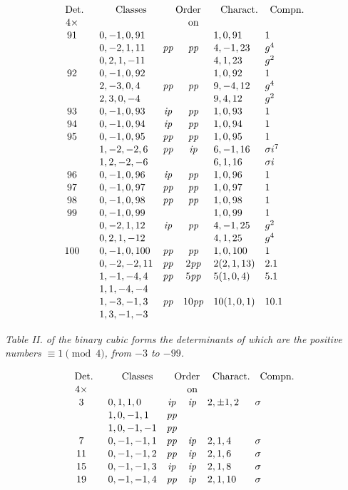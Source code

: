 ﻿\documentclass[11pt,a4paper]{article}
\theoremstyle{plain}
\theoremstyle{definition}
\newcommand{\pp}{\mathit{pp}}
\newcommand{\ip}{\mathit{ip}}
\newcommand{\sg}{\sigma}
\newcommand{\row}[7]{#1 & #2 & #3 & #4 & #5 & #6 & #7\\}
\begin{document}
\[
\renewcommand{\arraystretch}{1.06}
\begin{array}{c@{\quad}r@{\quad}l@{\quad}c@{\quad}c@{\quad}l@{\quad}l}
\multicolumn{1}{c}{\text{Det.}}&&
\multicolumn{1}{c}{\text{Classes}}&
\multicolumn{2}{c}{\text{Order}}&
\multicolumn{1}{c}{\text{Charact.}}&
\multicolumn{1}{c}{\text{Compn.}}\\
4\times&&& &\text{on}&&\\
\row{91}{}{0,-1,0,91}{}{}{1,0,91}{1}
\row{}{}{0,-2,1,11}{\pp}{\pp}{4,-1,23}{g^4}
\row{}{}{0,2,1,-11}{}{}{4,1,23}{g^2}
\row{92}{}{0,-1,0,92}{}{}{1,0,92}{1}
\row{}{}{2,-3,0,4}{\pp}{\pp}{9,-4,12}{g^4}
\row{}{}{2,3,0,-4}{}{}{9,4,12}{g^2}
\row{93}{}{0,-1,0,93}{\ip}{\pp}{1,0,93}{1}
\row{94}{}{0,-1,0,94}{\ip}{\pp}{1,0,94}{1}
\row{95}{}{0,-1,0,95}{\pp}{\pp}{1,0,95}{1}
\row{}{}{1,-2,-2,6}{\pp}{\ip}{6,-1,16}{\sg i^7}
\row{}{}{1,2,-2,-6}{}{}{6,1,16}{\sg i}
\row{96}{}{0,-1,0,96}{\ip}{\pp}{1,0,96}{1}
\row{97}{}{0,-1,0,97}{\pp}{\pp}{1,0,97}{1}
\row{98}{}{0,-1,0,98}{\pp}{\pp}{1,0,98}{1}
\row{99}{}{0,-1,0,99}{}{}{1,0,99}{1}
\row{}{}{0,-2,1,12}{\ip}{\pp}{4,-1,25}{g^2}
\row{}{}{0,2,1,-12}{}{}{4,1,25}{g^4}
\row{100}{}{0,-1,0,100}{\pp}{\pp}{1,0,100}{1}
\row{}{}{0,-2,-2,11}{\pp}{2\pp}{2(2,1,13)}{2.1}
\row{}{}{1,-1,-4,4}{\pp}{5\pp}{5(1,0,4)}{5.1}
\row{}{}{1,1,-4,-4}{}{}{}{}
\row{}{}{1,-3,-1,3}{\pp}{10\pp}{10(1,0,1)}{10.1}
\row{}{}{1,3,-1,-3}{}{}{}{}
\end{array}
\]

\textit{Table II. of the binary cubic forms the determinants of which are
the positive numbers \(\equiv 1\pmod 4\), from \(-3\) to \(-99\).}

\[
\renewcommand{\arraystretch}{1.08}
\begin{array}{c@{\quad}r@{\quad}l@{\quad}c@{\quad}c@{\quad}l@{\quad}l}
\multicolumn{1}{c}{\text{Det.}}&&
\multicolumn{1}{c}{\text{Classes}}&
\multicolumn{2}{c}{\text{Order}}&
\multicolumn{1}{c}{\text{Charact.}}&
\multicolumn{1}{c}{\text{Compn.}}\\
4\times&&& &\text{on}&&\\
\row{3}{}{0,1,1,0}{\ip}{\ip}{2,\pm1,2}{\sg}
\row{}{}{1,0,-1,1}{\pp}{}{}{}
\row{}{}{1,0,-1,-1}{\pp}{}{}{}
\row{7}{}{0,-1,-1,1}{\pp}{\ip}{2,1,4}{\sg}
\row{11}{}{0,-1,-1,2}{\pp}{\ip}{2,1,6}{\sg}
\row{15}{}{0,-1,-1,3}{\ip}{\ip}{2,1,8}{\sg}
\row{19}{}{0,-1,-1,4}{\pp}{\ip}{2,1,10}{\sg}
\end{array}
\]
\scriptsize
\setlength{\tabcolsep}{4pt}
\end{document}
